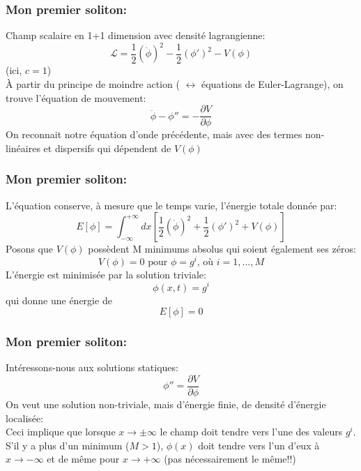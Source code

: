 \documentclass{beamer}
\begin{document}
\begin{frame}
\frametitle{Mon premier soliton:}
Champ scalaire en 1+1 dimension avec densité lagrangienne:
\begin{equation*}
\mathcal{L} = \frac{1}{2} (\dot{\phi})^{2} -\frac{1}{2} ({\phi'})^{2} -V\left( \phi \right)
\end{equation*}
(ici, $c=1$)\\
À partir du principe de moindre action ( $\leftrightarrow$ équations de Euler-Lagrange), on trouve l'équation de mouvement:\\
\begin{equation*}
\ddot{\phi} -\phi'' = - \dfrac{\partial V}{\partial \phi}
\end{equation*}
On reconnait notre équation d'onde précédente, mais avec des termes non-linéaires et dispersifs qui dépendent de $V\left( \phi \right)$
\end{frame}



\begin{frame}
\frametitle{Mon premier soliton:}
L'équation conserve, à mesure que le temps varie, l'énergie totale donnée par:
\begin{equation*}
E\left[  \phi \right] = \int_{-\infty} ^{+\infty} dx 
\left[   \frac{1}{2} (\dot{\phi})^{2} + \frac{1}{2} ({\phi'})^{2} + V\left( \phi \right)  \right] 
\end{equation*}
Posons que $V\left( \phi \right)$ possèdent M minimums absolus qui soient également ses zéros:
\begin{equation*}
V\left( \phi \right) = 0 \text{ pour } \phi = g^{i} \text{, où } i=1,...,M
\end{equation*}
L'énergie est minimisée par la solution triviale:
\begin{equation*}
\phi (x,t) = g^{i}
\end{equation*}
qui donne une énergie de
\begin{equation*}
E\left[  \phi \right]  = 0
\end{equation*}
\end{frame}



\begin{frame}
\frametitle{Mon premier soliton:}
Intéressons-nous aux solutions statiques:
\begin{equation*}
\phi'' =  \dfrac{\partial V}{\partial \phi}
\end{equation*}
On veut une solution non-triviale, mais d'énergie finie, de densité d'énergie localisée:\\
Ceci implique que lorsque $x\rightarrow \pm \infty$ le champ doit tendre vers l'une des valeurs $g^{i}$.
S'il y a plus d'un minimum ($M>1$), $\phi (x)$ doit tendre vers l'un d'eux à $x\rightarrow - \infty$ et de même pour $x\rightarrow + \infty$ (pas nécessairement le même!!)
\end{frame}
\end{document}
